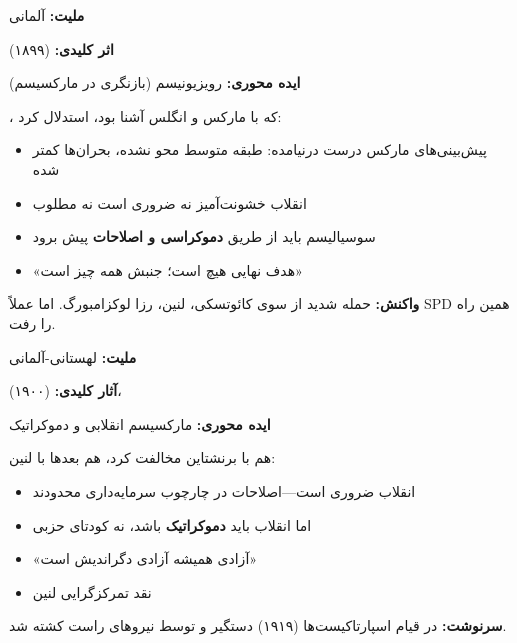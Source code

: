 \begin{personbox}

\textbf{ملیت:} آلمانی

\textbf{اثر کلیدی:}  (۱۸۹۹)

\textbf{ایده محوری:} رویزیونیسم (بازنگری در مارکسیسم)

\mediumspace

، که با مارکس و انگلس آشنا بود، استدلال کرد:

\begin{itemize}[nosep]
    \item پیش‌بینی‌های مارکس درست درنیامده: طبقه متوسط محو نشده، بحران‌ها کمتر شده
    \item انقلاب خشونت‌آمیز نه ضروری است نه مطلوب
    \item سوسیالیسم باید از طریق \textbf{دموکراسی و اصلاحات} پیش برود
    \item «هدف نهایی هیچ است؛ جنبش همه چیز است»
\end{itemize}

\mediumspace

\textbf{واکنش:} حمله شدید از سوی کائوتسکی، لنین، رزا لوکزامبورگ. اما عملاً SPD همین راه را رفت.
\end{personbox}

\begin{personbox}

\textbf{ملیت:} لهستانی-آلمانی

\textbf{آثار کلیدی:}  (۱۹۰۰)، 

\textbf{ایده محوری:} مارکسیسم انقلابی و دموکراتیک

\mediumspace

 هم با برنشتاین مخالفت کرد، هم بعدها با لنین:

\begin{itemize}[nosep]
    \item انقلاب ضروری است—اصلاحات در چارچوب سرمایه‌داری محدودند
    \item اما انقلاب باید \textbf{دموکراتیک} باشد، نه کودتای حزبی
    \item «آزادی همیشه آزادی دگراندیش است»
    \item نقد تمرکزگرایی لنین
\end{itemize}

\mediumspace

\textbf{سرنوشت:} در قیام اسپارتاکیست‌ها (۱۹۱۹) دستگیر و توسط نیروهای راست کشته شد.
\end{personbox}

